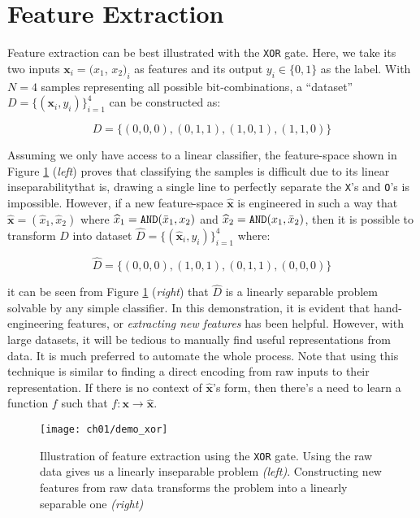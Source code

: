 \section{Feature Extraction}
\label{FeatureExtraction}

\par Feature extraction can be best illustrated with the \texttt{XOR} gate.
Here, we take its two inputs $\mathbf{x}_{i} = (x_{1}$, $x_{2})_{i}$ as features
and its output $y_{i} \in \{0,1\}$ as the label. With $N=4$ samples
representing all possible bit-combinations, a ``dataset''
$D=\{(\mathbf{x}_{i}, y_{i})\}_{i=1}^{4}$ can be constructed as:

\[
    D = \{(0,0,0), (0,1,1), (1,0,1), (1,1,0)\}
\]

Assuming we only have access to a linear classifier, the feature-space shown
in Figure  \ref{demo:xor} (\textit{left}) proves that classifying the samples is
difficult due to its linear inseparability\textemdash that is, drawing a single
line to perfectly separate the \texttt{X}'s and \texttt{O}'s is impossible.
However, if a new feature-space $\mathbf{\widehat{x}}$ is engineered in such a
way that $\mathbf{\widehat{x}} = (\widehat{x}_{1}, \widehat{x}_2)$ where 
$\widehat{x}_{1} = \text{\texttt{AND}}(\bar{x}_{1}, x_{2})$ and $\widehat{x}_{2}
= \text{\texttt{AND}}(x_{1}, \bar{x}_{2})$, then it is possible to transform $D$
into dataset $\widehat{D}=\{(\mathbf{\widehat{x}}_{i}, y_{i})\}_{i=1}^{4}$
where:

\[
    \widehat{D} = \{(0,0,0), (1,0,1), (0,1,1), (0,0,0)\}
\]

\noindent it can be seen from Figure \ref{demo:xor} (\textit{right}) that 
$\widehat{D}$ is a linearly separable problem solvable by any simple classifier.
In this demonstration, it is evident that hand-engineering features, or
\textit{extracting new features} has been helpful. However, with large
datasets, it will be tedious to manually find useful representations from data.
It is much preferred to automate the whole process. Note that  using this
technique is similar to finding a direct encoding from raw inputs to their 
representation. If there is no context of $\mathbf{\widehat{x}}$'s form, then
there's a need to learn a function $f$ such that $f: \mathbf{x} \rightarrow 
\mathbf{\widehat{x}}$.

\begin{figure}[!b]
  \centering
  \texttt{[image: ch01/demo\_xor]}
  \caption[Illustration of feature extraction using the \texttt{XOR} gate]{
      Illustration of feature extraction using the \texttt{XOR} gate. Using the
      raw data gives us a linearly inseparable problem \textit{(left)}.
      Constructing new features from raw data transforms the problem into a
      linearly separable one \textit{(right)}
  }
  \label{demo:xor}
\end{figure}

